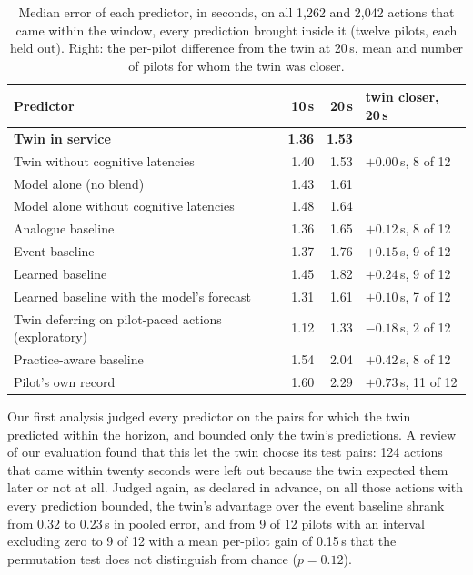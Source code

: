 \documentclass{llncs}
\begin{document}
\begin{table}[!t]
\caption{Median error of each predictor, in seconds, on all 1,262 and 2,042 actions that came within the window, every prediction
brought inside it (twelve pilots, each held out). Right: the per-pilot difference from the twin at 20\,s, mean and number of pilots for
whom the twin was closer.}
\label{tab:predictors}
\centering\small
\begin{tabular}{@{}lrr@{\qquad}l@{}}
\toprule
Predictor & 10\,s & 20\,s & twin closer, 20\,s \\
\midrule
\textbf{Twin in service} & \textbf{1.36} & \textbf{1.53} & \\
Twin without cognitive latencies & 1.40 & 1.53 & $+0.00$\,s, 8 of 12 \\
Model alone (no blend) & 1.43 & 1.61 & \\
Model alone without cognitive latencies & 1.48 & 1.64 & \\
Analogue baseline & 1.36 & 1.65 & $+0.12$\,s, 8 of 12 \\
Event baseline & 1.37 & 1.76 & $+0.15$\,s, 9 of 12 \\
Learned baseline & 1.45 & 1.82 & $+0.24$\,s, 9 of 12 \\
Learned baseline with the model's forecast & 1.31 & 1.61 & $+0.10$\,s, 7 of 12 \\
Twin deferring on pilot-paced actions (exploratory) & 1.12 & 1.33 & $-0.18$\,s, 2 of 12 \\
Practice-aware baseline & 1.54 & 2.04 & $+0.42$\,s, 8 of 12 \\
Pilot's own record & 1.60 & 2.29 & $+0.73$\,s, 11 of 12 \\
\bottomrule
\end{tabular}
\end{table}

Our first analysis judged every predictor on the pairs for which the twin predicted within the horizon, and bounded only the twin's
predictions. A review of our evaluation found that this let the twin choose its test pairs: 124 actions that came within twenty seconds
were left out because the twin expected them later or not at all. Judged again, as declared in advance, on all those actions with every
prediction bounded, the twin's advantage over the event baseline shrank from 0.32 to 0.23\,s in pooled error, and from 9 of 12 pilots
with an interval excluding zero to 9 of 12 with a mean per-pilot gain of 0.15\,s that the permutation test does not distinguish from
chance ($p = 0.12$).
\end{document}
